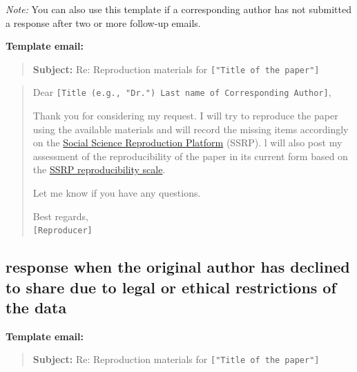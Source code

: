 \documentclass[
]{book}
\begin{document}
\emph{Note:} You can also use this template if a corresponding author has not submitted a response after two or more follow-up emails.

\textbf{Template email:}

\begin{quote}
\textbf{Subject:} Re: Reproduction materials for \texttt{{[}"Title\ of\ the\ paper"{]}}
\end{quote}

\begin{quote}
Dear \texttt{{[}Title\ (e.g.,\ "Dr.")\ Last\ name\ of\ Corresponding\ Author{]}},

Thank you for considering my request. I will try to reproduce the paper using the available materials and will record the missing items accordingly on the \href{https://www.socialsciencereproduction.org/}{Social Science Reproduction Platform} (SSRP). l will also post my assessment of the reproducibility of the paper in its current form based on the \href{https://bitss.github.io/ACRE/assessment.html\#levels-of-computational-reproducibility-for-a-specific-output}{SSRP reproducibility scale}.

Let me know if you have any questions.

Best regards,\\
\texttt{{[}Reproducer{]}}
\end{quote}

\hypertarget{response-when-the-original-author-has-declined-to-share-due-to-legal-or-ethical-restrictions-of-the-data}{%
\subsection{response when the original author has declined to share due to legal or ethical restrictions of the data}\label{response-when-the-original-author-has-declined-to-share-due-to-legal-or-ethical-restrictions-of-the-data}}

\textbf{Template email:}

\begin{quote}
\textbf{Subject:} Re: Reproduction materials for \texttt{{[}"Title\ of\ the\ paper"{]}}
\end{quote}
\end{document}
